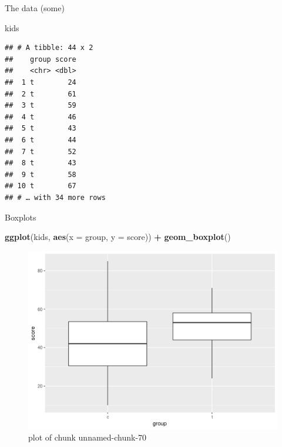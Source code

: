 \documentclass[ignorenonframetext,]{beamer}
\newenvironment{Shaded}{\begin{snugshade}}{\end{snugshade}}
\newcommand{\DataTypeTok}[1]{\textcolor[rgb]{0.13,0.29,0.53}{#1}}
\newcommand{\KeywordTok}[1]{\textcolor[rgb]{0.13,0.29,0.53}{\textbf{#1}}}
\newcommand{\NormalTok}[1]{#1}
\newcommand{\OperatorTok}[1]{\textcolor[rgb]{0.81,0.36,0.00}{\textbf{#1}}}
\newcommand{\StringTok}[1]{\textcolor[rgb]{0.31,0.60,0.02}{#1}}
\begin{document}
\begin{frame}[fragile]{The data (some)}
\protect\hypertarget{the-data-some-1}{}

\begin{Shaded}
\begin{Highlighting}[]
\NormalTok{kids}
\end{Highlighting}
\end{Shaded}

\begin{verbatim}
## # A tibble: 44 x 2
##    group score
##    <chr> <dbl>
##  1 t        24
##  2 t        61
##  3 t        59
##  4 t        46
##  5 t        43
##  6 t        44
##  7 t        52
##  8 t        43
##  9 t        58
## 10 t        67
## # … with 34 more rows
\end{verbatim}

\end{frame}

\begin{frame}[fragile]{Boxplots}
\protect\hypertarget{boxplots}{}

\begin{Shaded}
\begin{Highlighting}[]
\KeywordTok{ggplot}\NormalTok{(kids, }\KeywordTok{aes}\NormalTok{(}\DataTypeTok{x =}\NormalTok{ group, }\DataTypeTok{y =}\NormalTok{ score)) }\OperatorTok{+}\StringTok{ }\KeywordTok{geom_boxplot}\NormalTok{()}
\end{Highlighting}
\end{Shaded}

\begin{figure}
\centering
\includegraphics{figure/unnamed-chunk-70-1.png}
\caption{plot of chunk unnamed-chunk-70}
\end{figure}

\end{frame}
\end{document}
